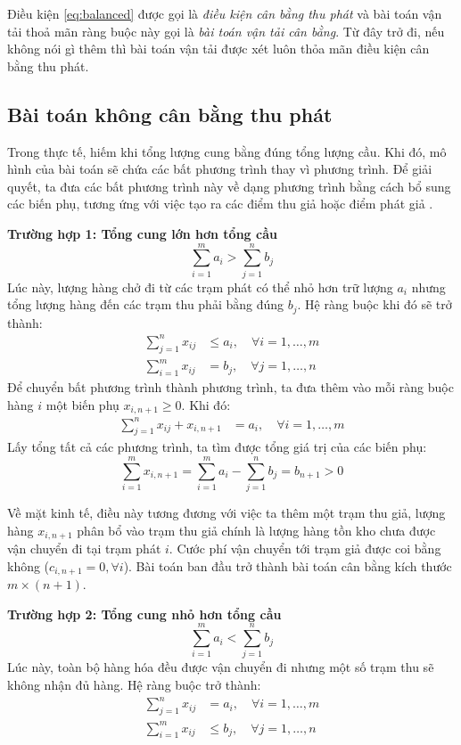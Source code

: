 \documentclass[../main.tex]{subfiles}
\begin{document}
Điều kiện \eqref{eq:balanced} được gọi là \textit{điều kiện cân bằng thu phát} và bài toán vận tải thoả mãn ràng buộc này gọi là \textit{bài toán vận tải cân bằng}. Từ đây trở đi, nếu không nói gì thêm thì bài toán vận tải được xét luôn thỏa mãn điều kiện cân bằng thu phát.

\subsection{Bài toán không cân bằng thu phát}
Trong thực tế, hiếm khi tổng lượng cung bằng đúng tổng lượng cầu. Khi đó, mô hình của bài toán sẽ chứa các bất phương trình thay vì phương trình. Để giải quyết, ta đưa các bất phương trình này về dạng phương trình bằng cách bổ sung các biến phụ, tương ứng với việc tạo ra các điểm thu giả hoặc điểm phát giả \cite{bachkim}.
    
\textbf{Trường hợp 1: Tổng cung lớn hơn tổng cầu}
\[ \sum_{i=1}^{m} a_i > \sum_{j=1}^{n} b_j \]
Lúc này, lượng hàng chở đi từ các trạm phát có thể nhỏ hơn trữ lượng $a_i$ nhưng tổng lượng hàng đến các trạm thu phải bằng đúng $b_j$. Hệ ràng buộc khi đó sẽ trở thành:
\begin{align*}
    \sum_{j=1}^{n} x_{ij} &\le a_i, \quad \forall i = 1, \dots, m \\
    \sum_{i=1}^{m} x_{ij} &= b_j, \quad \forall j = 1, \dots, n
\end{align*}
Để chuyển bất phương trình thành phương trình, ta đưa thêm vào mỗi ràng buộc hàng $i$ một biến phụ $x_{i, n+1} \ge 0$. Khi đó:
\begin{align*}
    \sum_{j=1}^{n} x_{ij} + x_{i, n+1} &= a_i, \quad \forall i = 1, \dots, m
\end{align*}
Lấy tổng tất cả các phương trình, ta tìm được tổng giá trị của các biến phụ:
\[ \sum_{i=1}^{m} x_{i, n+1} = \sum_{i=1}^{m} a_i - \sum_{j=1}^{n} b_j = b_{n+1} > 0 \]

Về mặt kinh tế, điều này tương đương với việc ta thêm một trạm thu giả, lượng hàng $x_{i, n+1}$ phân bổ vào trạm thu giả chính là lượng hàng tồn kho chưa được vận chuyển đi tại trạm phát $i$. Cước phí vận chuyển tới trạm giả được coi bằng không ($c_{i, n+1} = 0, \forall i$). Bài toán ban đầu trở thành bài toán cân bằng kích thước $m \times (n+1)$.
    
\textbf{Trường hợp 2: Tổng cung nhỏ hơn tổng cầu}
\[ \sum_{i=1}^{m} a_i < \sum_{j=1}^{n} b_j \]
Lúc này, toàn bộ hàng hóa đều được vận chuyển đi nhưng một số trạm thu sẽ không nhận đủ hàng. Hệ ràng buộc trở thành:
\begin{align*}
    \sum_{j=1}^{n} x_{ij} &= a_i, \quad \forall i = 1, \dots, m \\
    \sum_{i=1}^{m} x_{ij} &\le b_j, \quad \forall j = 1, \dots, n
\end{align*}
\end{document}
